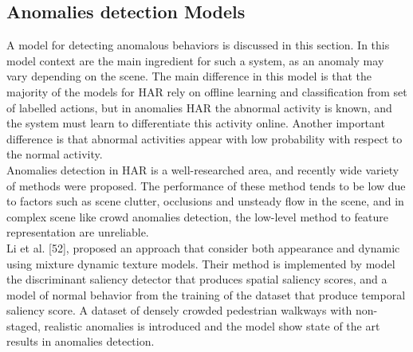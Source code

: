 \subsection{Anomalies detection Models}
\hspace{5mm} A model for detecting anomalous behaviors is discussed in this section. In this model context are the main ingredient for such a system, as an anomaly may vary depending on the scene. The main difference in this model is that the majority of the models for HAR rely on offline learning and classification from set of labelled actions, but in anomalies HAR the abnormal activity is known, and the system must learn to differentiate this activity online. Another important difference is that abnormal activities appear with low probability with respect to the normal activity. \\

Anomalies detection in HAR is a well-researched area, and recently wide variety of methods were proposed. The performance of these method tends to be low due to factors such as scene clutter, occlusions and unsteady flow in the scene, and in complex scene like crowd anomalies detection, the low-level method to feature representation are unreliable. \\
Li et al. [52], proposed an approach that consider both appearance and dynamic using mixture dynamic texture models. Their method is implemented by model the discriminant saliency detector that produces spatial saliency scores, and a model of normal behavior from the training of the dataset that produce temporal saliency score. A dataset of densely crowded pedestrian walkways with non-staged, realistic anomalies is introduced and the model show state of the art results in anomalies detection. \\

